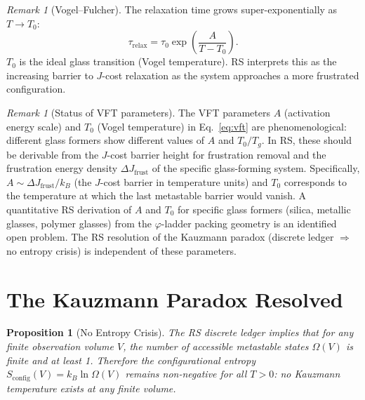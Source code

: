 \documentclass[12pt,a4paper]{article}
\newtheorem{proposition}[theorem]{Proposition}
\theoremstyle{definition}
\theoremstyle{remark}
\newtheorem{remark}[theorem]{Remark}
\begin{document}
\begin{remark}[Vogel--Fulcher]
The relaxation time grows super-exponentially as $T \to T_0$:
\begin{equation}
  \tau_{\mathrm{relax}} = \tau_0 \exp\left( \frac{A}{T - T_0} \right).
  \label{eq:vft}
\end{equation}
$T_0$ is the ideal glass transition (Vogel temperature).  RS
interprets this as the increasing barrier to $J$-cost relaxation as
the system approaches a more frustrated configuration.
\end{remark}

\begin{remark}[Status of VFT parameters]
\label{rem:vft-open}
The VFT parameters $A$ (activation energy scale) and $T_0$ (Vogel
temperature) in Eq.~\eqref{eq:vft} are phenomenological: different glass
formers show different values of $A$ and $T_0/T_g$.  In RS, these
should be derivable from the $J$-cost barrier height for frustration
removal and the frustration energy density $\Delta J_{\mathrm{frust}}$
of the specific glass-forming system.  Specifically, $A \sim
\Delta J_{\mathrm{frust}} / k_B$ (the $J$-cost barrier in temperature
units) and $T_0$ corresponds to the temperature at which the last
metastable barrier would vanish.  A quantitative RS derivation of $A$
and $T_0$ for specific glass formers (silica, metallic glasses, polymer
glasses) from the $\varphi$-ladder packing geometry is an identified
open problem.  The RS resolution of the Kauzmann paradox (discrete
ledger $\Rightarrow$ no entropy crisis) is independent of these
parameters.
\end{remark}

\section{The Kauzmann Paradox Resolved}
\label{sec:kauzmann}

\begin{proposition}[No Entropy Crisis]
\label{thm:kauzmann}
The RS discrete ledger implies that for any finite observation
volume $V$, the number of accessible metastable states $\Omega(V)$
is finite and at least 1.  Therefore the configurational entropy
$S_{\mathrm{config}}(V) = k_B \ln \Omega(V)$ remains non-negative
for all $T > 0$: no Kauzmann temperature exists at any finite
volume.
\end{proposition}
\end{document}
